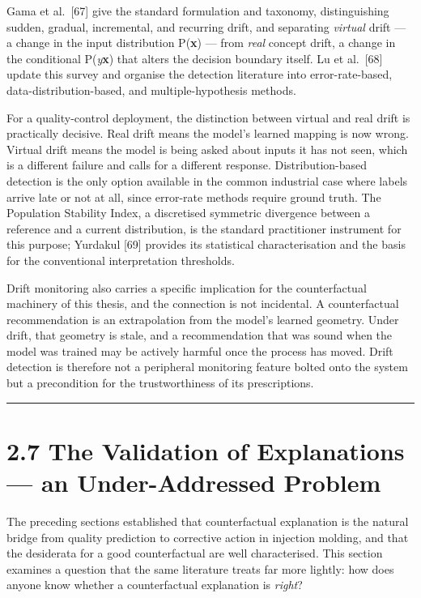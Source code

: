 Gama et al.~{[}67{]} give the standard formulation and taxonomy, distinguishing sudden, gradual, incremental, and recurring drift, and separating \emph{virtual} drift --- a change in the input distribution P(\textbf{x}) --- from \emph{real} concept drift, a change in the conditional P(\emph{y}\textbar{}\textbf{x}) that alters the decision boundary itself. Lu et al.~{[}68{]} update this survey and organise the detection literature into error-rate-based, data-distribution-based, and multiple-hypothesis methods.

For a quality-control deployment, the distinction between virtual and real drift is practically decisive. Real drift means the model's learned mapping is now wrong. Virtual drift means the model is being asked about inputs it has not seen, which is a different failure and calls for a different response. Distribution-based detection is the only option available in the common industrial case where labels arrive late or not at all, since error-rate methods require ground truth. The Population Stability Index, a discretised symmetric divergence between a reference and a current distribution, is the standard practitioner instrument for this purpose; Yurdakul {[}69{]} provides its statistical characterisation and the basis for the conventional interpretation thresholds.

Drift monitoring also carries a specific implication for the counterfactual machinery of this thesis, and the connection is not incidental. A counterfactual recommendation is an extrapolation from the model's learned geometry. Under drift, that geometry is stale, and a recommendation that was sound when the model was trained may be actively harmful once the process has moved. Drift detection is therefore not a peripheral monitoring feature bolted onto the system but a precondition for the trustworthiness of its prescriptions.

\begin{center}\rule{0.5\linewidth}{0.5pt}\end{center}

\hypertarget{the-validation-of-explanations-an-under-addressed-problem}{%
\section{2.7 The Validation of Explanations --- an Under-Addressed Problem}\label{the-validation-of-explanations-an-under-addressed-problem}}

The preceding sections established that counterfactual explanation is the natural bridge from quality prediction to corrective action in injection molding, and that the desiderata for a good counterfactual are well characterised. This section examines a question that the same literature treats far more lightly: how does anyone know whether a counterfactual explanation is \emph{right}?

